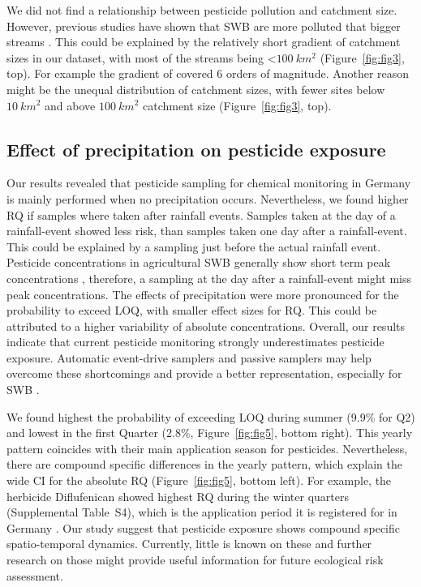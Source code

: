 \documentclass[journal=esthag,manuscript=article]{achemso}
\begin{document}
We did not find a relationship between pesticide pollution and catchment size.
However, previous studies have shown that SWB are more polluted that bigger streams \citep{schulz_field_2004,stehle_pesticide_2015,knauer_pesticides_2016}.
This could be explained by the relatively short gradient of catchment sizes in our dataset, with most of the streams being \textless $100~km^2$ (Figure~\ref{fig:fig3}, top).
For example the gradient of \citet{schulz_field_2004} covered 6 orders of magnitude.
Another reason might be the unequal distribution of catchment sizes, with fewer sites below $10~km^2$ and above $100~km^2$ catchment size (Figure~\ref{fig:fig3}, top).



\subsection{Effect of precipitation on pesticide exposure}
Our results revealed that pesticide sampling for chemical monitoring in Germany is mainly performed when no precipitation occurs. 
Nevertheless, we found higher RQ if samples where taken after rainfall events. 
Samples taken at the day of a rainfall-event showed less risk, than samples taken one day after a rainfall-event.
This could be explained by a sampling just before the actual rainfall event.
Pesticide concentrations in agricultural SWB generally show short term peak concentrations \citep{wittmer_significance_2010}, therefore, a sampling at the day after a rainfall-event might miss peak concentrations.
The effects of precipitation were more pronounced for the probability to exceed LOQ, with smaller effect sizes for RQ.
This could be attributed to a higher variability of absolute concentrations.
Overall, our results indicate that current pesticide monitoring strongly underestimates pesticide exposure.
Automatic event-drive samplers \citep{stehle_probabilistic_2013} and passive samplers \citep{fernandez_calibration_2014,moschet_evaluation_2015} may help overcome these shortcomings and provide a better representation, especially for SWB \citep{lorenz_specifics_2016}. 

We found highest the probability of exceeding LOQ during summer (9.9\% for Q2) and lowest in the first Quarter (2.8\%, Figure~\ref{fig:fig5}, bottom right).
This yearly pattern coincides with their main application season for pesticides.
Nevertheless, there are compound specific differences in the yearly pattern, which explain the wide CI for the absolute RQ (Figure~\ref{fig:fig5}, bottom left).
For example, the herbicide Diflufenican showed highest RQ during the winter quarters (Supplemental Table~S4), which is the application period it is registered for in Germany \citep{bvl_online_2016}.
Our study suggest that pesticide exposure shows compound specific spatio-temporal dynamics.
Currently, little is known on these and further research on those might provide useful information for future ecological risk assessment. 
\end{document}
